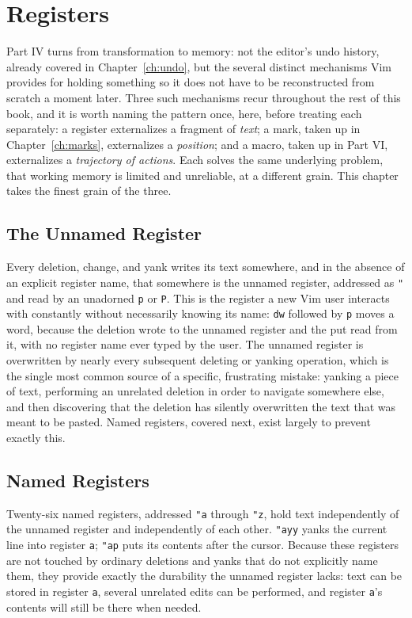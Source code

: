\chapter{Registers}
\label{ch:registers}

Part IV turns from transformation to memory: not the editor's undo history, already covered in Chapter~\ref{ch:undo}, but the several distinct mechanisms Vim provides for holding something so it does not have to be reconstructed from scratch a moment later. Three such mechanisms recur throughout the rest of this book, and it is worth naming the pattern once, here, before treating each separately: a register externalizes a fragment of \textit{text}; a mark, taken up in Chapter~\ref{ch:marks}, externalizes a \textit{position}; and a macro, taken up in Part VI, externalizes a \textit{trajectory of actions}. Each solves the same underlying problem, that working memory is limited and unreliable, at a different grain. This chapter takes the finest grain of the three.

\section{The Unnamed Register}

Every deletion, change, and yank writes its text somewhere, and in the absence of an explicit register name, that somewhere is the unnamed register, addressed as \texttt{"} and read by an unadorned \texttt{p} or \texttt{P}. This is the register a new Vim user interacts with constantly without necessarily knowing its name: \texttt{dw} followed by \texttt{p} moves a word, because the deletion wrote to the unnamed register and the put read from it, with no register name ever typed by the user. The unnamed register is overwritten by nearly every subsequent deleting or yanking operation, which is the single most common source of a specific, frustrating mistake: yanking a piece of text, performing an unrelated deletion in order to navigate somewhere else, and then discovering that the deletion has silently overwritten the text that was meant to be pasted. Named registers, covered next, exist largely to prevent exactly this.

\section{Named Registers}

Twenty-six named registers, addressed \texttt{"a} through \texttt{"z}, hold text independently of the unnamed register and independently of each other. \texttt{"ayy} yanks the current line into register \texttt{a}; \texttt{"ap} puts its contents after the cursor. Because these registers are not touched by ordinary deletions and yanks that do not explicitly name them, they provide exactly the durability the unnamed register lacks: text can be stored in register \texttt{a}, several unrelated edits can be performed, and register \texttt{a}'s contents will still be there when needed.

